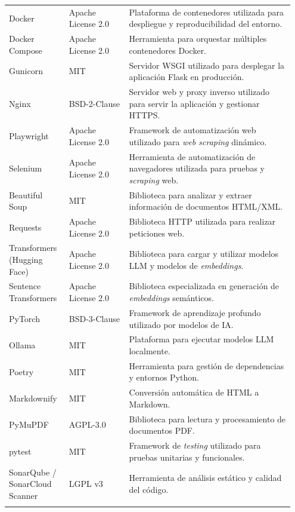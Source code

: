\begin{longtable}{p{0.20\linewidth} p{0.20\linewidth} p{0.55\linewidth}}
Docker & Apache License 2.0 & Plataforma de contenedores utilizada para despliegue y reproducibilidad del entorno. \\

Docker Compose & Apache License 2.0 & Herramienta para orquestar múltiples contenedores Docker. \\

Gunicorn & MIT & Servidor WSGI utilizado para desplegar la aplicación Flask en producción. \\

Nginx & BSD-2-Clause & Servidor web y proxy inverso utilizado para servir la aplicación y gestionar HTTPS. \\

Playwright & Apache License 2.0 & Framework de automatización web utilizado para \emph{web scraping} dinámico. \\

Selenium & Apache License 2.0 & Herramienta de automatización de navegadores utilizada para pruebas y \emph{scraping} web. \\

Beautiful Soup & MIT & Biblioteca para analizar y extraer información de documentos HTML/XML. \\

Requests & Apache License 2.0 & Biblioteca HTTP utilizada para realizar peticiones web. \\

Transformers (Hugging Face) & Apache License 2.0 & Biblioteca para cargar y utilizar modelos LLM y modelos de \emph{embeddings}. \\

Sentence Transformers & Apache License 2.0 & Biblioteca especializada en generación de \emph{embeddings} semánticos. \\

PyTorch & BSD-3-Clause & Framework de aprendizaje profundo utilizado por modelos de IA. \\

Ollama & MIT & Plataforma para ejecutar modelos LLM localmente. \\

Poetry & MIT & Herramienta para gestión de dependencias y entornos Python. \\

Markdownify & MIT & Conversión automática de HTML a Markdown. \\

PyMuPDF & AGPL-3.0 & Biblioteca para lectura y procesamiento de documentos PDF. \\

pytest & MIT & Framework de \emph{testing} utilizado para pruebas unitarias y funcionales. \\

SonarQube / SonarCloud Scanner & LGPL v3 & Herramienta de análisis estático y calidad del código. \\
\label{tabla:licencias}
\end{longtable}



